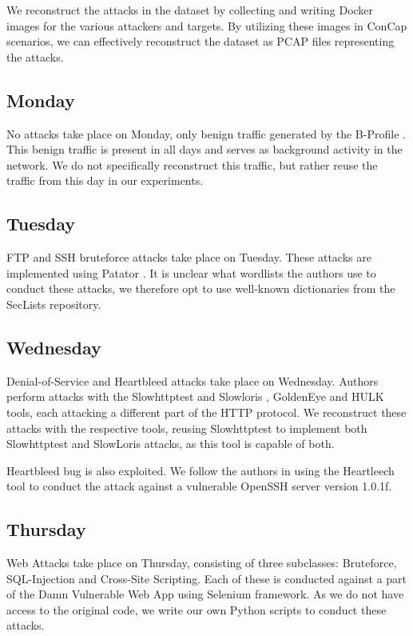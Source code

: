 \documentclass[conference]{IEEEtran}
\begin{document}
	We reconstruct the attacks in the dataset by collecting and writing Docker images for the various attackers and targets. By utilizing these images in ConCap scenarios, we can effectively reconstruct the dataset as PCAP files representing the attacks.
	
	\subsection{Monday}
	No attacks take place on Monday, only benign traffic generated by the B-Profile \cite{b_profile}. This benign traffic is present in all days and serves as background activity in the network. We do not specifically reconstruct this traffic, but rather reuse the traffic from this day in our experiments.
	
	\subsection{Tuesday}
	FTP and SSH bruteforce attacks take place on Tuesday. These attacks are implemented using Patator \cite{patator}. It is unclear what wordlists the authors use to conduct these attacks, we therefore opt to use well-known dictionaries from the SecLists \cite{seclists} repository.
	
	\subsection{Wednesday}
	Denial-of-Service and Heartbleed attacks take place on Wednesday. Authors perform attacks with the Slowhttptest and Slowloris \cite{slowhttptest}, GoldenEye \cite{goldeneye} and HULK \cite{hulk} tools, each attacking a different part of the HTTP protocol. We reconstruct these attacks with the respective tools, reusing Slowhttptest to implement both Slowhttptest and SlowLoris attacks, as this tool is capable of both.
	
	Heartbleed bug \cite{heartbleed} is also exploited. We follow the authors in using the Heartleech \cite{heartleech} tool to conduct the attack against a vulnerable OpenSSH server version 1.0.1f.
	
	\subsection{Thursday}
	Web Attacks take place on Thursday, consisting of three subclasses: Bruteforce, SQL-Injection and Cross-Site Scripting. Each of these is conducted against a part of the Damn Vulnerable Web App \cite{dvwa} using Selenium framework. As we do not have access to the original code, we write our own Python scripts to conduct these attacks.
	
\end{document}
